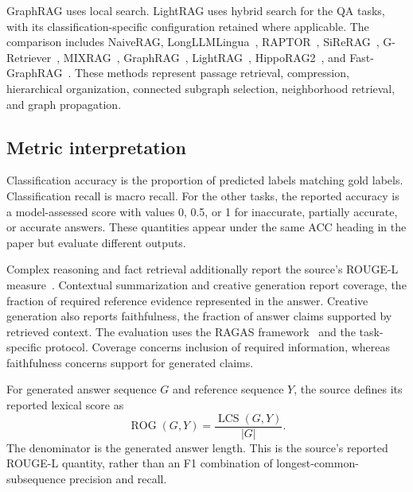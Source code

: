 GraphRAG uses local search. LightRAG uses hybrid search for the QA tasks, with its classification-specific configuration retained where applicable. The comparison includes NaiveRAG, LongLLMLingua~\cite{agrag-jiang-etal-2024-longllmlingua}, RAPTOR~\cite{agrag-sarthi2024raptor}, SiReRAG~\cite{agrag-zhang2025sirerag}, G-Retriever~\cite{agrag-he2024g}, MIXRAG~\cite{agrag-liu2025mixrag}, GraphRAG~\cite{agrag-edge2024local}, LightRAG~\cite{agrag-guo2024lightrag}, HippoRAG2~\cite{agrag-gutiérrez2025ragmemory}, and Fast-GraphRAG~\cite{agrag-fastgraphrag}. These methods represent passage retrieval, compression, hierarchical organization, connected subgraph selection, neighborhood retrieval, and graph propagation.

\subsection{Metric interpretation}
Classification accuracy is the proportion of predicted labels matching gold labels. Classification recall is macro recall. For the other tasks, the reported accuracy is a model-assessed score with values 0, 0.5, or 1 for inaccurate, partially accurate, or accurate answers. These quantities appear under the same ACC heading in the paper but evaluate different outputs.

Complex reasoning and fact retrieval additionally report the source's ROUGE-L measure~\cite{agrag-lin2004rouge}. Contextual summarization and creative generation report coverage, the fraction of required reference evidence represented in the answer. Creative generation also reports faithfulness, the fraction of answer claims supported by retrieved context. The evaluation uses the RAGAS framework~\cite{agrag-ragas2024,mgrag-es2024ragas} and the task-specific protocol. Coverage concerns inclusion of required information, whereas faithfulness concerns support for generated claims.

For generated answer sequence $G$ and reference sequence $Y$, the source defines its reported lexical score as
\begin{equation}
\operatorname{ROG}(G,Y)=\frac{\operatorname{LCS}(G,Y)}{|G|}.
\label{eq:agrag:rouge}
\end{equation}
The denominator is the generated answer length. This is the source's reported ROUGE-L quantity, rather than an F1 combination of longest-common-subsequence precision and recall.

